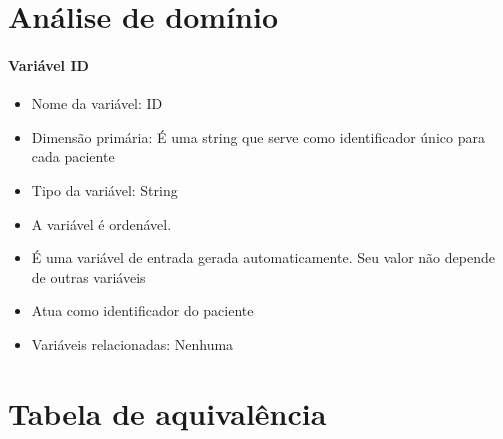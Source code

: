 \section*{Análise de domínio}

\paragraph{Variável ID}
\begin{itemize}
\item Nome da variável: ID
\item Dimensão primária: É uma string que serve como identificador único para
    cada paciente
\item Tipo da variável: String
\item A variável é ordenável.
\item É uma variável de entrada gerada automaticamente. Seu valor não depende
    de outras variáveis
\item Atua como identificador do paciente
\item Variáveis relacionadas: Nenhuma
\end{itemize}
\section*{Tabela de aquivalência}


